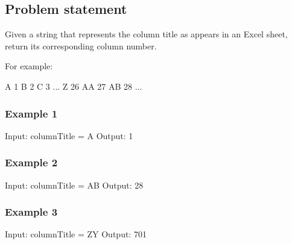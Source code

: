 \documentclass[letterpaper,12pt,english]{book}
\begin{document}
\subsection{Problem statement\sphinxfootnotemark[119]}
\label{\detokenize{Mathematics/09_MTH_171_Excel_Sheet_Collumn_Number:problem-statement}}%
\begin{footnotetext}[119]\sphinxAtStartFootnote
{}
%
\end{footnotetext}\ignorespaces 
\sphinxAtStartPar
Given a string  that represents the column title as appears in an Excel sheet, return its corresponding column number.

\sphinxAtStartPar
For example:

\begin{sphinxVerbatim}[commandchars=\\\{\}]
A \PYGZhy{}\PYGZgt{} 1
B \PYGZhy{}\PYGZgt{} 2
C \PYGZhy{}\PYGZgt{} 3
...
Z \PYGZhy{}\PYGZgt{} 26
AA \PYGZhy{}\PYGZgt{} 27
AB \PYGZhy{}\PYGZgt{} 28 
...
\end{sphinxVerbatim}


\subsubsection{Example 1}
\label{\detokenize{Mathematics/09_MTH_171_Excel_Sheet_Collumn_Number:example-1}}
\begin{sphinxVerbatim}[commandchars=\\\{\}]
Input: columnTitle = \PYGZdq{}A\PYGZdq{}
Output: 1
\end{sphinxVerbatim}


\subsubsection{Example 2}
\label{\detokenize{Mathematics/09_MTH_171_Excel_Sheet_Collumn_Number:example-2}}
\begin{sphinxVerbatim}[commandchars=\\\{\}]
Input: columnTitle = \PYGZdq{}AB\PYGZdq{}
Output: 28
\end{sphinxVerbatim}


\subsubsection{Example 3}
\label{\detokenize{Mathematics/09_MTH_171_Excel_Sheet_Collumn_Number:example-3}}
\begin{sphinxVerbatim}[commandchars=\\\{\}]
Input: columnTitle = \PYGZdq{}ZY\PYGZdq{}
Output: 701
\end{sphinxVerbatim}
\end{document}
